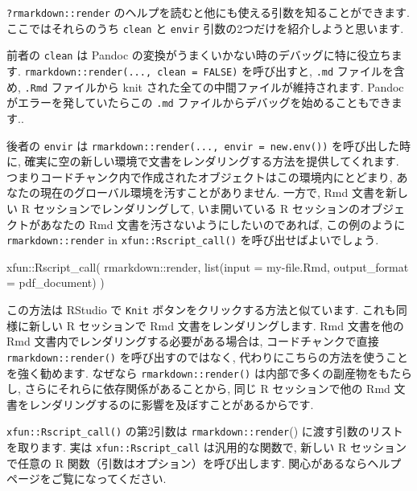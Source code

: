 \documentclass[
  11pt,
  lualatex,ja=standard,jafont=noto]{bxjsreport}
\newenvironment{Shaded}{\begin{snugshade}}{\end{snugshade}}
\newcommand{\AttributeTok}[1]{\textcolor[rgb]{0.77,0.63,0.00}{#1}}
\newcommand{\FunctionTok}[1]{\textcolor[rgb]{0.00,0.00,0.00}{#1}}
\newcommand{\NormalTok}[1]{#1}
\newcommand{\SpecialCharTok}[1]{\textcolor[rgb]{0.00,0.00,0.00}{#1}}
\newcommand{\StringTok}[1]{\textcolor[rgb]{0.31,0.60,0.02}{#1}}
\begin{document}
\texttt{?rmarkdown::render} のヘルプを読むと他にも使える引数を知ることができます. ここではそれらのうち \texttt{clean} と \texttt{envir} 引数の2つだけを紹介しようと思います.

前者の \texttt{clean} は Pandoc の変換がうまくいかない時のデバッグに特に役立ちます. \texttt{rmarkdown::render(..., clean = FALSE)} を呼び出すと, \texttt{.md} ファイルを含め, \texttt{.Rmd} ファイルから knit された全ての中間ファイルが維持されます. Pandoc がエラーを発していたらこの \texttt{.md} ファイルからデバッグを始めることもできます..

後者の \texttt{envir} は \texttt{rmarkdown::render(..., envir = new.env())} を呼び出した時に, 確実に空の新しい環境で文書をレンダリングする方法を提供してくれます. つまりコードチャンク内で作成されたオブジェクトはこの環境内にとどまり, あなたの現在のグローバル環境を汚すことがありません. 一方で, Rmd 文書を新しい R セッションでレンダリングして, いま開いている R セッションのオブジェクトがあなたの Rmd 文書を汚さないようにしたいのであれば, この例のように \texttt{rmarkdown::render} in \texttt{xfun::Rscript\_call()} を呼び出せばよいでしょう.

\begin{Shaded}
\begin{Highlighting}[numbers=left,,]
\NormalTok{xfun}\SpecialCharTok{::}\FunctionTok{Rscript\_call}\NormalTok{(}
\NormalTok{  rmarkdown}\SpecialCharTok{::}\NormalTok{render,}
  \FunctionTok{list}\NormalTok{(}\AttributeTok{input =} \StringTok{\textquotesingle{}my{-}file.Rmd\textquotesingle{}}\NormalTok{, }\AttributeTok{output\_format =} \StringTok{\textquotesingle{}pdf\_document\textquotesingle{}}\NormalTok{)}
\NormalTok{)}
\end{Highlighting}
\end{Shaded}

この方法は RStudio で \texttt{Knit} ボタンをクリックする方法と似ています. これも同様に新しい R セッションで Rmd 文書をレンダリングします. Rmd 文書を他の Rmd 文書内でレンダリングする必要がある場合は, コードチャンクで直接 \texttt{rmarkdown::render()} を呼び出すのではなく, 代わりにこちらの方法を使うことを強く勧めます. なぜなら \texttt{rmarkdown::render()} は内部で多くの副産物をもたらし, さらにそれらに依存関係があることから, 同じ R セッションで他の Rmd 文書をレンダリングするのに影響を及ぼすことがあるからです.

\texttt{xfun::Rscript\_call()} の第2引数は \texttt{rmarkdown::render}() に渡す引数のリストを取ります. 実は \texttt{xfun::Rscript\_call} は汎用的な関数で, 新しい R セッションで任意の R 関数（引数はオプション）を呼び出します. 関心があるならヘルプページをご覧になってください.
\end{document}
